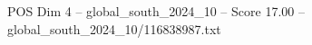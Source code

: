 \begin{textsample}{POS Dim 4 – global\_south\_2024\_10 – Score 17.00 – global\_south\_2024\_10/116838987.txt}
\end{textsample}
